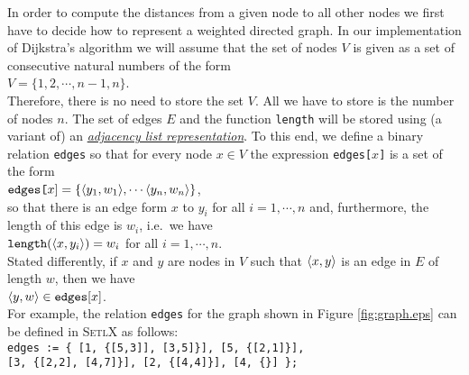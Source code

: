 In order to compute the distances from a given node to all other nodes we first have to decide how
to represent a weighted directed graph.  In our implementation of Dijkstra's algorithm we will
assume that the set of nodes $V$ is given as a set of consecutive natural numbers of the form
\\[0.2cm]
\hspace*{1.3cm}
$V = \{ 1, 2, \cdots, n-1, n \}$.
\\[0.2cm]
Therefore, there is no need to store the set $V$.  All we have to store is the number of nodes $n$.
The set of edges $E$ and the function \texttt{length} will be stored using (a variant of) an
\href{http://en.wikipedia.org/wiki/Adjacency_list}{\emph{adjacency list representation}}.
To this end, we define a binary relation \texttt{edges} so that for every node $x \in V$ the
expression \texttt{edges[$x$]} is a set of the form
\\[0.2cm]
\hspace*{1.3cm}
$\texttt{edges[}x\mathtt{]} = \{ \pair(y_1,w_1), \cdots \pair(y_n,w_n) \}$, 
\\[0.2cm]
so that there is an edge form $x$ to $y_i$ for all $i=1,\cdots,n$ and, furthermore, the length of
this edge is $w_i$, i.e.~we have 
\\[0.2cm]
\hspace*{1.3cm}
$\mathtt{length}(\pair(x,y_i)) = w_i$ \quad for all $i=1,\cdots,n$.
\\[0.2cm]
Stated differently, if $x$ and $y$ are nodes in $V$ such that $\pair(x,y)$ is an edge in $E$ of length
$w$, then we have
\\[0.2cm]
\hspace*{1.3cm}
$\pair(y,w) \in \mathtt{edges[}x\mathtt{]}$.
\\[0.2cm]
For example, the relation \texttt{edges} for the graph shown in Figure \ref{fig:graph.eps} can be
defined in \textsc{SetlX} as follows:
\\[0.2cm]
\hspace*{1.3cm}
\texttt{edges := \{ [1, \{[5,3]], [3,5]\}], [5, \{[2,1]\}], \\
\hspace*{3.25cm} 
[3, \{[2,2], [4,7]\}], [2, \{[4,4]\}], [4, \{\}] \};}


